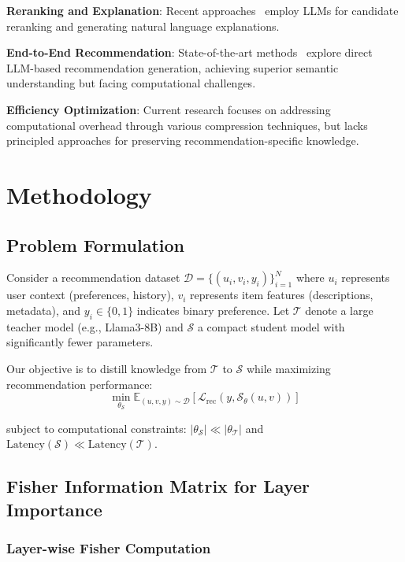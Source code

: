 \documentclass[10pt,conference]{IEEEtran}
\newcommand{\loss}{\mathcal{L}}
\newcommand{\student}{\mathcal{S}}
\newcommand{\teacher}{\mathcal{T}}
\begin{document}
\textbf{Reranking and Explanation}: Recent approaches~\cite{li2023chatgpt,dai2023uncovering} employ LLMs for candidate reranking and generating natural language explanations.

\textbf{End-to-End Recommendation}: State-of-the-art methods~\cite{geng2022recommendation,bao2023tallrec} explore direct LLM-based recommendation generation, achieving superior semantic understanding but facing computational challenges.

\textbf{Efficiency Optimization}: Current research focuses on addressing computational overhead through various compression techniques, but lacks principled approaches for preserving recommendation-specific knowledge.

\section{Methodology}

\subsection{Problem Formulation}

Consider a recommendation dataset $\mathcal{D} = \{(u_i, v_i, y_i)\}_{i=1}^N$ where $u_i$ represents user context (preferences, history), $v_i$ represents item features (descriptions, metadata), and $y_i \in \{0,1\}$ indicates binary preference. Let $\teacher$ denote a large teacher model (e.g., Llama3-8B) and $\student$ a compact student model with significantly fewer parameters.

Our objective is to distill knowledge from $\teacher$ to $\student$ while maximizing recommendation performance:
\begin{equation}
\min_{\theta_{\student}} \mathbb{E}_{(u,v,y) \sim \mathcal{D}} \left[ \loss_{\text{rec}}(y, \student_{\theta}(u,v)) \right]
\end{equation}

subject to computational constraints: $|\theta_{\student}| \ll |\theta_{\teacher}|$ and $\text{Latency}(\student) \ll \text{Latency}(\teacher)$.

\subsection{Fisher Information Matrix for Layer Importance}

\subsubsection{Layer-wise Fisher Computation}
\end{document}
